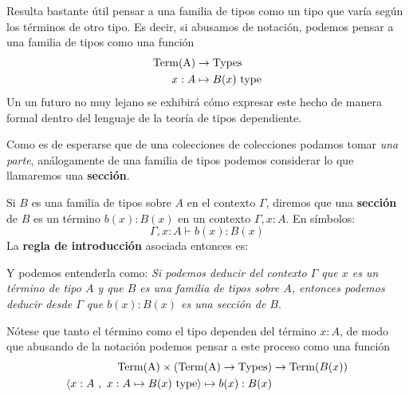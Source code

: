 \documentclass{article}
\begin{document}
        \begin{remark}
            Resulta bastante útil pensar a una familia de tipos como un tipo que varía según los términos de otro tipo. 
            Es decir, si abusamos de notación, podemos pensar a una familia de tipos como una función 
            \begin{align*}
                \mathrm{Term(A)} &\rightarrow \mathrm{Types}\\
                x : A &\mapsto B(x)\ \type
            \end{align*}
            Un un futuro no muy lejano se exhibirá cómo expresar este hecho de manera formal dentro del lenguaje de la teoría de tipos dependiente.
        \end{remark}

        Como es de esperarse que de una colecciones de colecciones podamos tomar \textit{una parte}, análogamente de una familia de tipos
        podemos considerar lo que llamaremos una \textbf{sección}.

        \begin{definition}
            Si $B$ es una familia de tipos sobre $A$ en el contexto $\Gamma$, diremos que una \textbf{sección} de $B$ es un término $b(x) : B(x)$ en un contexto
            $\Gamma, x : A$. En símbolos:
            $$
                \Gamma, x : A \vdash b(x) : B(x)
            $$
            La \textbf{regla de introducción} asociada entonces es:

            \begin{prooftree}
            \end{prooftree}
            Y podemos entenderla como:
            \textit{Si podemos deducir del contexto $\Gamma$ que $x$ es un término de tipo $A$ y que $B$ es una familia de tipos sobre $A$, 
            entonces podemos deducir desde $\Gamma$ que $b(x) : B(x)$ es una sección de $B$}.
        \end{definition}

        \begin{remark}
            Nótese que tanto el término como el tipo dependen del término 
            $x : A$, de modo que abusando de la notación podemos pensar a este 
            proceso como una función
            \begin{align*}
                \mathrm{Term(A)} \times (\mathrm{Term(A)} \rightarrow \mathrm{Types}) &\rightarrow \mathrm{Term}(B(x))\\
                \picopar{x : A\ ,\ x : A \mapsto B(x)\ \type}\mapsto b(x) : B(x)
            \end{align*}
        \end{remark}
        
\end{document}
